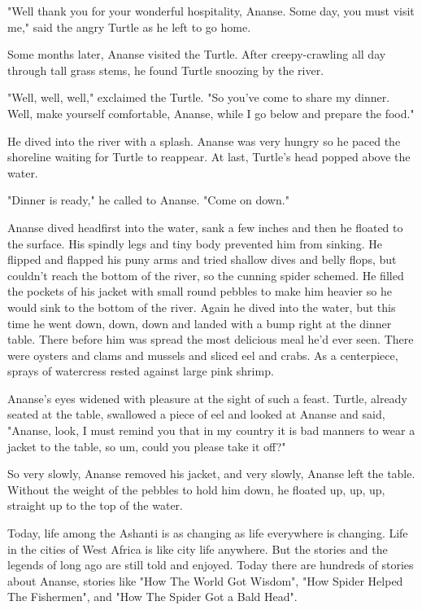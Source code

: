 "Well thank you for your wonderful hospitality, Ananse. Some day, you must visit me," said the angry Turtle as he left to go home.

Some months later, Ananse visited the Turtle. After creepy-crawling all day through tall grass stems, he found Turtle snoozing by the river.

"Well, well, well," exclaimed the Turtle. "So you've come to share my dinner. Well, make yourself comfortable, Ananse, while I go below and prepare the food."

He dived into the river with a splash. Ananse was very hungry so he paced the shoreline waiting for Turtle to reappear. At last, Turtle's head popped above the water.

"Dinner is ready," he called to Ananse. "Come on down."

Ananse dived headfirst into the water, sank a few inches and then he floated to the surface. His spindly legs and tiny body prevented him from sinking. He flipped and flapped his puny arms and tried shallow dives and belly flops, but couldn't reach the bottom of the river, so the cunning spider schemed. He filled the pockets of his jacket with small round pebbles to make him heavier so he would sink to the bottom of the river. Again he dived into the water, but this time he went down, down, down and landed with a bump right at the dinner table. There before him was spread the most delicious meal he'd ever seen. There were oysters and clams and mussels and sliced eel and crabs. As a centerpiece, sprays of watercress rested against large pink shrimp.

Ananse's eyes widened with pleasure at the sight of such a feast. Turtle, already seated at the table, swallowed a piece of eel and looked at Ananse and said, "Ananse, look, I must remind you that in my country it is bad manners to wear a jacket to the table, so um, could you please take it off?"

So very slowly, Ananse removed his jacket, and very slowly, Ananse left the table. Without the weight of the pebbles to hold him down, he floated up, up, up, straight up to the top of the water.

Today, life among the Ashanti is as changing as life everywhere is changing. Life in the cities of West Africa is like city life anywhere. But the stories and the legends of long ago are still told and enjoyed. Today there are hundreds of stories about Ananse, stories like "How The World Got Wisdom", "How Spider Helped The Fishermen", and "How The Spider Got a Bald Head".

